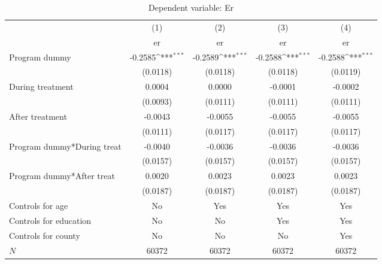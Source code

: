 \begin{table}[htbp]\centering
\def\sym#1{\ifmmode^{#1}\else\(^{#1}\)\fi}
\caption{Dependent variable: Er}
\begin{tabular}{l*{4}{c}}
\hline\hline
            &\multicolumn{1}{c}{(1)}&\multicolumn{1}{c}{(2)}&\multicolumn{1}{c}{(3)}&\multicolumn{1}{c}{(4)}\\
            &\multicolumn{1}{c}{er}&\multicolumn{1}{c}{er}&\multicolumn{1}{c}{er}&\multicolumn{1}{c}{er}\\
\hline
Program dummy&     -0.2585\sym{***}&     -0.2589\sym{***}&     -0.2588\sym{***}&     -0.2588\sym{***}\\
            &    (0.0118)         &    (0.0118)         &    (0.0118)         &    (0.0119)         \\
[1em]
During treatment&      0.0004         &      0.0000         &     -0.0001         &     -0.0002         \\
            &    (0.0093)         &    (0.0111)         &    (0.0111)         &    (0.0111)         \\
[1em]
After treatment&     -0.0043         &     -0.0055         &     -0.0055         &     -0.0055         \\
            &    (0.0111)         &    (0.0117)         &    (0.0117)         &    (0.0117)         \\
[1em]
Program dummy*During treat&     -0.0040         &     -0.0036         &     -0.0036         &     -0.0036         \\
            &    (0.0157)         &    (0.0157)         &    (0.0157)         &    (0.0157)         \\
[1em]
Program dummy*After treat&      0.0020         &      0.0023         &      0.0023         &      0.0023         \\
            &    (0.0187)         &    (0.0187)         &    (0.0187)         &    (0.0187)         \\
[1em]
Controls for age &          No         &         Yes         &         Yes         &         Yes         \\
[1em]
Controls for education &          No         &          No         &         Yes         &         Yes         \\
[1em]
Controls for county &          No         &          No         &          No         &         Yes         \\
\hline
\(N\)       &       60372         &       60372         &       60372         &       60372         \\

\end{tabular}
\end{table}
